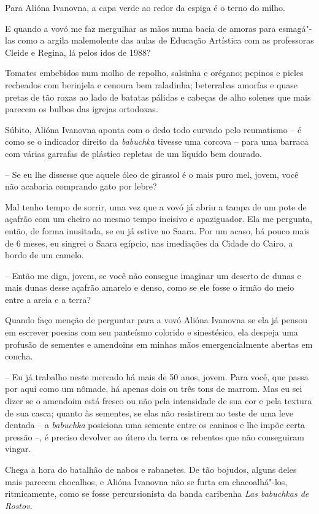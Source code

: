 Para Alióna Ivanovna, a capa verde ao redor da espiga é o terno do
milho.

E quando a vovó me faz mergulhar as mãos numa bacia de amoras para
esmagá"-las como a argila malemolente das aulas de Educação Artística com
as professoras Cleide e Regina, lá pelos idos de 1988?

Tomates embebidos num molho de repolho, salsinha e orégano; pepinos e
picles recheados com berinjela e cenoura bem raladinha; beterrabas
amorfas e quase pretas de tão roxas ao lado de batatas pálidas e cabeças
de alho solenes que mais parecem os bulbos das igrejas ortodoxas.

Súbito, Alióna Ivanovna aponta com o dedo todo curvado pelo reumatismo
-- é como se o indicador direito da \emph{babuchka} tivesse uma corcova
-- para uma barraca com várias garrafas de plástico repletas de um
líquido bem dourado.

-- Se eu lhe dissesse que aquele óleo de girassol é o mais puro mel,
jovem, você não acabaria comprando gato por lebre?

Mal tenho tempo de sorrir, uma vez que a vovó já abriu a tampa de um
pote de açafrão com um cheiro ao mesmo tempo incisivo e apaziguador. Ela
me pergunta, então, de forma inusitada, se eu já estive no Saara. Por um
acaso, há pouco mais de 6 meses, eu singrei o Saara egípcio, nas
imediações da Cidade do Cairo, a bordo de um camelo.

-- Então me diga, jovem, se você não consegue imaginar um deserto de
dunas e mais dunas desse açafrão amarelo e denso, como se ele fosse o
irmão do meio entre a areia e a terra?

Quando faço menção de perguntar para a vovó Alióna Ivanovna se ela já
pensou em escrever poesias com seu panteísmo colorido e sinestésico, ela
despeja uma profusão de sementes e amendoins em minhas mãos
emergencialmente abertas em concha.

-- Eu já trabalho neste mercado há mais de 50 anos, jovem. Para você,
que passa por aqui como um nômade, há apenas dois ou três tons de
marrom. Mas eu sei dizer se o amendoim está fresco ou não pela
intensidade de sua cor e pela textura de sua casca; quanto às sementes,
se elas não resistirem ao teste de uma leve dentada -- a \emph{babuchka}
posiciona uma semente entre os caninos e lhe impõe certa pressão --, é
preciso devolver ao útero da terra os rebentos que não conseguiram
vingar.

Chega a hora do batalhão de nabos e rabanetes. De tão bojudos, alguns
deles mais parecem chocalhos, e Alióna Ivanovna não se furta em
chacoalhá"-los, ritmicamente, como se fosse percursionista da banda
caribenha \emph{Las babuchkas de Rostov. }

